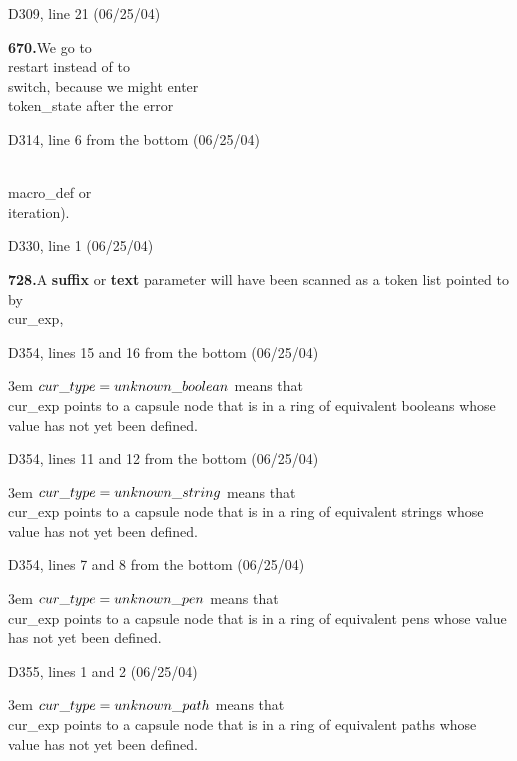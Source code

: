 {{\bugonpage D309, line 21 (06/25/04)

\noindent
{\bf670.\quad}We go to \\{restart} instead of to \\{switch},
because we might enter \\{token\_state} after the error\cutpar

\bugonpage D314, line 6 from the bottom (06/25/04)

\noindent
\\{macro\_def} or \\{iteration}).

\bugonpage D330, line 1 (06/25/04)

\noindent
{\bf728.\quad}A {\bf suffix} or {\bf text} parameter will have been scanned as
a token list pointed to by \\{cur\_exp},\cutpar

\bugonpage D354, lines 15 and 16 from the bottom (06/25/04)

\noindent\hangindent 3em
$\\{cur\_type}=\\{unknown\_boolean}$ means that \\{cur\_exp} points to a
capsule node that is in
a ring of equivalent booleans whose value has not yet been defined.

\bugonpage D354, lines 11 and 12 from the bottom (06/25/04)

\noindent\hangindent 3em
$\\{cur\_type}=\\{unknown\_string}$ means that \\{cur\_exp} points to a
capsule node that is in
a ring of equivalent strings whose value has not yet been defined.

\bugonpage D354, lines 7 and 8 from the bottom (06/25/04)

\noindent\hangindent 3em
$\\{cur\_type}=\\{unknown\_pen}$ means that \\{cur\_exp} points to a
capsule node that is in
a ring of equivalent pens whose value has not yet been defined.

\bugonpage D355, lines 1 and 2 (06/25/04)

\noindent\hangindent 3em
$\\{cur\_type}=\\{unknown\_path}$ means that \\{cur\_exp} points to a
capsule node that is in
a ring of equivalent paths whose value has not yet been defined.

}}
